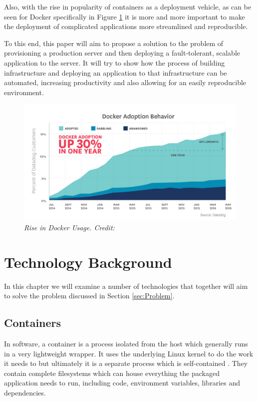 \documentclass{article}
\begin{document}
Also, with the rise in popularity of containers as a deployment vehicle, as can be seen for Docker specifically in Figure \ref{fig:datadog} it is more and more important to make the deployment of complicated applications more streamlined and reproducible.

To this end, this paper will aim to propose a solution to the problem of provisioning a production server and then deploying a fault-tolerant, scalable application to the server. It will try to show how the process of building infrastructure and deploying an application to that infrastructure can be automated, increasing productivity and also allowing for an easily reproducible environment.

\begin{figure}[!h]
\centering
\includegraphics*[width=1\textwidth]{components/images/datadog}
\caption{\em Rise in Docker Usage. Credit: \citep{datadog}}
\label{fig:datadog}
\end{figure}
 
\newpage
\section{Technology Background}
\label{sec:Background}

In this chapter we will examine a number of technologies that together will aim to solve the problem discussed in Section \ref{sec:Problem}.

\subsection{Containers} %
\label{sub:Containers}
In software, a container is a process isolated from the host which generally runs in a very lightweight wrapper. It uses the underlying Linux kernel to do the work it needs to but ultimately it is a separate process which is self-contained \citep{Matthias2015}. They contain complete filesystems which can house everything the packaged application needs to run, including code, environment variables, libraries and dependencies.
\end{document}
